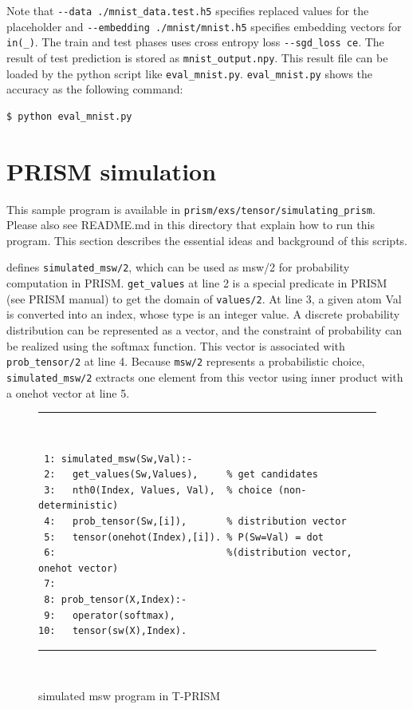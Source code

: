 \documentclass[a4paper]{report}
\begin{document}
Note that \verb|--data ./mnist_data.test.h5|
 specifies replaced values for the placeholder and 
\verb|--embedding ./mnist/mnist.h5| specifies embedding vectors for {\tt in(\_)}.
The train and test phases uses cross entropy loss \verb|--sgd_loss ce|.
The result of test prediction is stored as {\tt mnist\_output.npy}.
This result file can be loaded by the python script like \verb|eval_mnist.py|.
\verb|eval_mnist.py| shows the accuracy as the following command:
\begin{verbatim}
$ python eval_mnist.py
\end{verbatim}


\section{PRISM simulation}
\label{sec:simulated_msw}

This sample program is available in \verb|prism/exs/tensor/simulating_prism|.
Please also see README.md in this directory that explain how to run  this program.
This section describes the essential ideas and background of this scripts. 

 defines {\tt simulated\_msw/2}, which can be used as {msw/2} for probability computation in PRISM.
{\tt get\_values} at line 2  is a special predicate in PRISM (see PRISM manual) to get the domain of {\tt values/2}.
At line 3, a given atom Val is converted into an index, whose type is an integer value. 
A discrete probability distribution can be represented as a vector, and the constraint of probability can be realized using the softmax function.
This vector is associated with {\tt prob\_tensor/2}  at line 4.
Because {\tt msw/2} represents a probabilistic choice,
{\tt simulated\_msw/2} extracts one element from this vector using inner product with a onehot vector at line 5.

\begin{figure}[tb]
	\rule{0.85\textwidth}{0.10mm}\\ [-1em]
	\begin{verbatim}
 1: simulated_msw(Sw,Val):-
 2:   get_values(Sw,Values),     % get candidates
 3:   nth0(Index, Values, Val),  % choice (non-deterministic)
 4:   prob_tensor(Sw,[i]),       % distribution vector
 5:   tensor(onehot(Index),[i]). % P(Sw=Val) = dot
 6:                              %(distribution vector, onehot vector)
 7: 
 8: prob_tensor(X,Index):-
 9:   operator(softmax),
10:   tensor(sw(X),Index).
	\end{verbatim}
	\rule{0.85\textwidth}{0.10mm}\\ [-1em]
	\caption{simulated msw program in T-PRISM}
	\label{fig:simulated_msw}
\end{figure}
\end{document}

